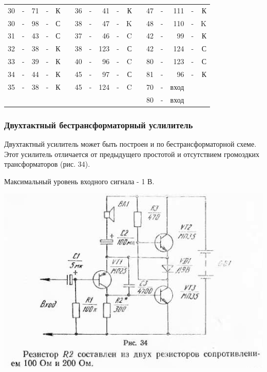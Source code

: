 \documentclass[12pt]{article}
\begin{document}
\hrulefill

\begin{tabular}{r c r c r p{2cm} r c r c r p{2cm} r c r c r}
30 & - & 71 & - & К &     & 36 & - &  41 & - & К &    &  47 & - & 111  & - & К\\
30 & - & 98 & - & С &     & 38 & - &  47 & - & K &    &  48 & - & 110  & - & K\\
31 & - & 43 & - & С &     & 37 & - &  46 & - & C &    &  42 & - &  99  & - & К\\
32 & - & 38 & - & К &     & 38 & - & 123 & - & С &    &  42 & - & 124  & - & С\\
33 & - & 39 & - & К &     & 40 & - &  96 & - & C &    &  80 & - & 123  & - & С\\
34 & - & 44 & - & К &     & 45 & - &  97 & - & С &    &  81 & - &  96  & - & К\\
35 & - & 38 & - & К &     & 45 & - & 124 & - & C &    &  70 & - & вход &   & \\
   &   &    &   &   &     &    &   &     &   &   &    &  80 & - & вход &   & \\
\end{tabular}

\hrulefill

\newpage

\subsubsection{Двухтактный бестрансформаторный услилитель}

Двухтактный усилитель  может быть построен и по бестрансформаторной схеме. Этот усилитель отличается от предыдущего простотой и отсутствием громоздких трансформаторов (рис. 34).

Максимальный уровень входного сигнала - 1 В.

\includegraphics[scale=0.85]{ekon3_030_1}
\end{document}
